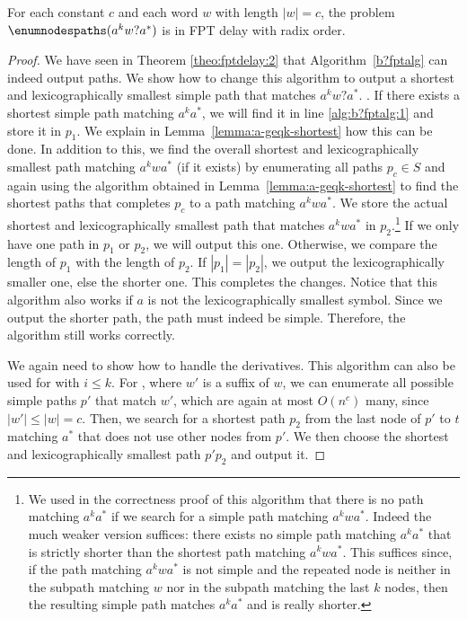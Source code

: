 \documentclass[a4paper,english]{lipics-v2016}
\theoremstyle{plain}
\begin{document}
 \begin{lemma}
 For each constant $c$ and each word $w$ with length $|w|=c$, the problem $\enumnodespaths(a^kw?a^*)$ is in FPT delay with radix order. \label{lemma:w?-shortest}
 \end{lemma}
 \begin{proof}
 We have seen in Theorem \ref{theo:fptdelay:2} that Algorithm~\ref{b?fptalg} can indeed output paths. 
 We show how to change this algorithm 
 to output a shortest and lexicographically smallest simple path that matches $a^kw?a^*$. .    If there exists a shortest simple path matching $a^ka^*$, we will find it in line \ref{alg:b?fptalg:1} and store it in $p_1$. We explain in Lemma~\ref{lemma:a-geqk-shortest} how this can be done. In addition to this, we find the overall shortest and lexicographically smallest path matching $a^kw a^*$ (if it exists) by enumerating all paths $p_c \in S$ and again using the algorithm obtained in Lemma~\ref{lemma:a-geqk-shortest} to find the shortest paths that completes $p_c$ to a path matching $a^kw a^*$. 
  We store the actual shortest and lexicographically smallest path that
 matches $a^kw a^*$ in $p_2$.\footnote{We used in the correctness
   proof of this algorithm that there is no path matching $a^ka^*$ if
   we search for a simple path matching $a^kw a^*$. Indeed the much
   weaker version suffices: there exists no simple path matching
   $a^ka^*$ that is strictly shorter than the shortest path matching $a^kw a^*$. This suffices since, if the path matching $a^kw a^*$ is not simple and the repeated node is neither in the subpath matching $w$ nor in the subpath matching the last $k$ nodes, then the resulting simple path matches $a^ka^*$ and is really shorter.}
  If we only have one path in $p_1$ or $p_2$, we will output this one. 
 Otherwise, we compare the length of $p_1$ with the length of $p_2$. If $|p_1| = |p_2|$, we output the lexicographically smaller one, else the shorter one. This completes the changes. Notice that this algorithm also works if $a$ is not the lexicographically smallest symbol. Since we output the shorter path, the path must indeed be simple. Therefore, the algorithm still works correctly.
 
 We again need to show how to handle the derivatives. 
 This algorithm can also be used for  with $i \leq k$. For , where $w'$ is a suffix of $w$, we can enumerate all possible simple paths $p'$ that match $w'$, which are again at most $O(n^c)$ many, since $|w'|\leq |w| = c$. Then, we search for a shortest path $p_2$ from the last node of $p'$ to $t$ matching $a^*$ that does not use other nodes from $p'$. We then choose the shortest and lexicographically smallest path $p'p_2$ and output it.
 \end{proof}
\end{document}
